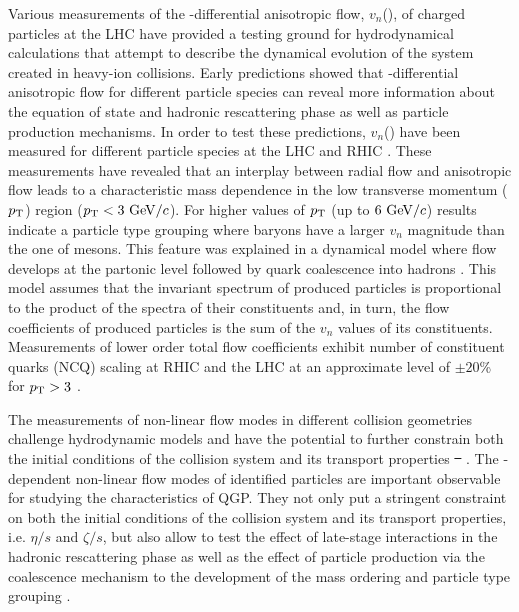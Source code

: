 \documentclass[ALICE,manyauthors]{cernphprep}
\providecommand{\DIFaddtex}[1]{{\protect\color{blue}\uwave{#1}}} %
\providecommand{\DIFdeltex}[1]{{\protect\color{red}\sout{#1}}}                      %
\providecommand{\DIFaddbegin}{} %
\providecommand{\DIFaddend}{} %
\providecommand{\DIFdelbegin}{} %
\providecommand{\DIFdelend}{} %
\providecommand{\DIFadd}[1]{\texorpdfstring{\DIFaddtex{#1}}{#1}} %
\providecommand{\DIFdel}[1]{\texorpdfstring{\DIFdeltex{#1}}{}} %
\begin{document}
Various measurements of the \pT-differential anisotropic flow, $v_{n}$(\pT), of charged particles at the LHC \cite{ALICE:2011ab, ATLAS:2012at, Chatrchyan:2013kba, Acharya:2018lmh} have provided a testing ground for hydrodynamical calculations that attempt to describe the dynamical evolution of the system created in heavy-ion collisions. Early predictions showed that \pT-differential anisotropic flow for different particle species can reveal more information about the equation of state and hadronic rescattering phase \cite{Voloshin:1996nv,Huovinen:2001cy} as well as particle production mechanisms. In order to test these predictions, $v_{n}$(\pT) have been measured for different particle species at the LHC \cite{Abelev:2014pua,Adam:2015eta,Adam:2016nfo,Acharya:2018zuq} and RHIC \cite{Adams:2003am,Abelev:2007qg,Adler:2003kt,Adare:2006ti}. These measurements have revealed that an interplay between radial flow and anisotropic flow leads to a characteristic mass dependence in the low transverse momentum ($p_{\rm{T}}$) region ($p_{\rm{T}} < 3~{\rm GeV}/c$). For higher values of $p_{\rm{T}}$ (up to $6~{\rm GeV}/c$) results indicate a particle type grouping where baryons have a larger $v_{n}$ magnitude than the one of mesons. This feature was explained in a dynamical model where flow develops at the partonic level followed by quark coalescence into hadrons \cite{Voloshin:2002wa,Molnar:2003ff}. This model assumes that the invariant spectrum of produced particles is proportional to the product of the spectra of their constituents and, in turn, the flow coefficients of produced particles is the sum of the $v_{n}$ values of its constituents. Measurements of lower order total flow coefficients exhibit number of constituent quarks (NCQ) scaling at RHIC \cite{Adare:2012vq} and the LHC \cite{Abelev:2014pua,Adam:2016nfo} at an approximate level of $\pm20$\% for $p_{\rm{T}} > 3$ \GeV.

The measurements of non-linear flow modes in different collision geometries challenge hydrodynamic models and have the potential to further constrain both the initial conditions of the collision system and its transport properties \DIFdelbegin \DIFdel{\mbox{%
\cite{Acharya:2017zfg}}%
}\DIFdelend \DIFaddbegin \DIFadd{\mbox{%
\cite{Zhu:2016puf, Acharya:2017zfg}}%
}\DIFaddend . The \pT-dependent non-linear flow modes of identified particles are important observable for studying the characteristics of QGP. They not only put a stringent constraint on both the initial conditions of the collision system and its transport properties, i.e. $\eta/s$ and $\zeta/s$, but also allow to test the effect of late-stage interactions in the hadronic rescattering phase as well as the effect of particle production via the coalescence mechanism to the development of the mass ordering and particle type grouping \cite{ALICE:2011ab,Acharya:2018zuq}.
\end{document}
